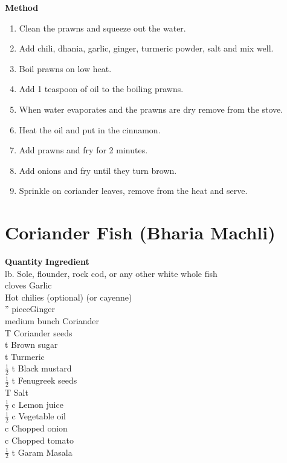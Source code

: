 {\bf Method}
\begin{enumerate}
   \item Clean the prawns and squeeze out the water.
   \item Add chili, dhania, garlic, ginger, turmeric powder,  salt  and  mix
      well.
   \item Boil prawns on low heat.
   \item Add 1 teaspoon of oil to the boiling prawns.
   \item When water evaporates and the prawns are dry remove from the stove.
   \item Heat the oil and put in the cinnamon.
   \item Add prawns and fry for 2 minutes.
   \item Add onions and fry until they turn brown.
   \item Sprinkle on coriander leaves, remove from the heat and serve.
\end{enumerate}

\section{Coriander Fish (Bharia Machli)}

\begin{tabbing}
\hspace{1.0cm}  \={\bf Quantity}   \hspace{3.0cm} \={\bf Ingredient}\\

 lb. \>Sole, flounder, rock cod, or any other white whole fish\\
 cloves \>Garlic\\
 \>Hot chilies (optional) (or cayenne)\\
'' piece\>Ginger\\
 medium bunch \>Coriander\\
  T \>Coriander seeds\\
 t \>Brown sugar\\
  t \>Turmeric\\
\>$\frac{1}{2}$ t \>Black mustard\\
\>  $\frac{1}{2}$ t \>Fenugreek seeds\\
 T \>Salt\\
\>  $\frac{1}{2}$ c \>Lemon juice\\
\>$\frac{1}{2}$ c \>Vegetable oil\\
 c \>Chopped onion\\
 c \>Chopped tomato\\
\>  $\frac{1}{2}$ t \>Garam Masala\\
\end{tabbing}

